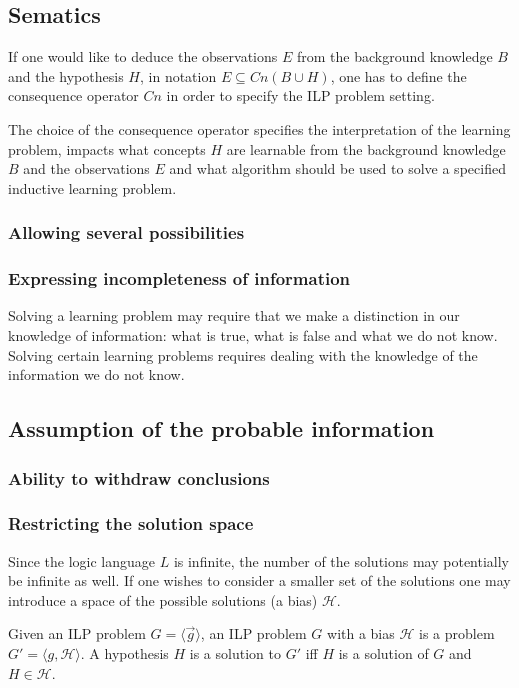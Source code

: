 \subsection{Sematics}\label{problems_in_ilp_semantics}
If one would like to deduce the observations $E$ from the background knowledge $B$ and the hypothesis $H$, in notation $E \subseteq Cn(B \cup H)$, one has to define the consequence operator $Cn$ in order to specify the ILP problem setting.

The choice of the consequence operator specifies the interpretation of the learning problem, impacts what concepts $H$ are learnable from the background knowledge $B$ and the observations $E$ and what algorithm should be used to solve a specified inductive learning problem.

\subsubsection{Allowing several possibilities}


\subsubsection{Expressing incompleteness of information}
Solving a learning problem may require that we make a distinction in our knowledge of information: what is true, what is false and what we do not know.
Solving certain learning problems requires dealing with the knowledge of the information we do not know.

\subsection{Assumption of the probable information}

\subsubsection{Ability to withdraw conclusions}

\subsubsection{Restricting the solution space}
Since the logic language $L$ is infinite, the number of the solutions may potentially be infinite as well. If one wishes to consider a smaller set of the solutions one may introduce a space of the possible solutions (a bias) $\mathcal{H}$.
\begin{defn}
Given an ILP problem $G=\langle \overrightarrow{g} \rangle$,
an ILP problem $G$ with a bias $\mathcal{H}$ is a problem
$G'=\langle g, \mathcal{H} \rangle$.
A hypothesis $H$ is a solution to $G'$ iff $H$ is a solution of $G$ and $H \in \mathcal{H}$.
\end{defn}

